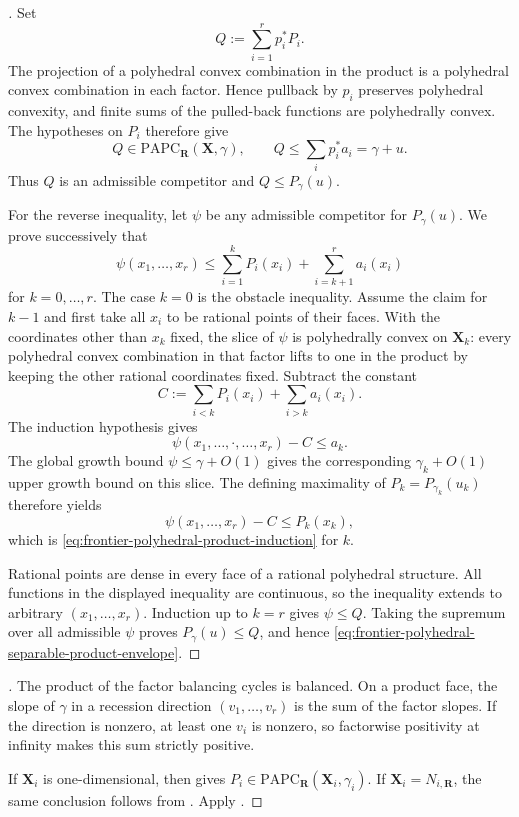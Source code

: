 
\begin{proof}[]
Set
\[
                         Q:=\sum_{i=1}^r p_i^*P_i.
\]
The projection of a polyhedral convex combination in the product is a
polyhedral convex combination in each factor.  Hence pullback by $p_i$
preserves polyhedral convexity, and finite sums of the pulled-back functions
are polyhedrally convex.  The hypotheses on $P_i$ therefore give
\[
 Q\in\mathrm{PAPC}_{\mathbf R}(\mathbf X,\gamma),
 \qquad
 Q\leq\sum_i p_i^*a_i=\gamma+u.
\]
Thus $Q$ is an admissible competitor and $Q\leq P_\gamma(u)$.

For the reverse inequality, let $\psi$ be any admissible competitor for
$P_\gamma(u)$.  We prove successively that
\[
 \psi(x_1,\ldots,x_r)
 \leq
 \sum_{i=1}^k P_i(x_i)+\sum_{i=k+1}^r a_i(x_i)
 \tag{**}\label{eq:frontier-polyhedral-product-induction}
\]
for $k=0,\ldots,r$.  The case $k=0$ is the obstacle inequality.  Assume the
claim for $k-1$ and first take all $x_i$ to be rational points of their
faces.  With the coordinates other than $x_k$ fixed, the slice of $\psi$ is
polyhedrally convex on $\mathbf X_k$: every polyhedral convex combination in
that factor lifts to one in the product by keeping the other rational
coordinates fixed.  Subtract the constant
\[
 C:=\sum_{i<k}P_i(x_i)+\sum_{i>k}a_i(x_i).
\]
The induction hypothesis gives
\[
                 \psi(x_1,\ldots,\mathord{\cdot},\ldots,x_r)-C
                 \leq a_k.
\]
The global growth bound $\psi\leq\gamma+O(1)$ gives the corresponding
$\gamma_k+O(1)$ upper growth bound on this slice.  The defining maximality
of $P_k=P_{\gamma_k}(u_k)$ therefore yields
\[
                 \psi(x_1,\ldots,x_r)-C\leq P_k(x_k),
\]
which is \eqref{eq:frontier-polyhedral-product-induction} for $k$.

Rational points are dense in every face of a rational polyhedral structure.
All functions in the displayed inequality are continuous, so the inequality
extends to arbitrary $(x_1,\ldots,x_r)$.  Induction up to $k=r$ gives
$\psi\leq Q$.  Taking the supremum over all admissible $\psi$ proves
$P_\gamma(u)\leq Q$, and hence
\eqref{eq:frontier-polyhedral-separable-product-envelope}.
\end{proof}

\begin{proof}[]
The product of the factor balancing cycles is balanced.  On a product face,
the slope of $\gamma$ in a recession direction $(v_1,\ldots,v_r)$ is the
sum of the factor slopes.  If the direction is nonzero, at least one $v_i$
is nonzero, so factorwise positivity at infinity makes this sum strictly
positive.

If $\mathbf X_i$ is one-dimensional, then
 gives
$P_i\in\mathrm{PAPC}_{\mathbf R}(\mathbf X_i,\gamma_i)$.  If
$\mathbf X_i=N_{i,\mathbf R}$, the same conclusion follows from
.  Apply
.
\end{proof}
